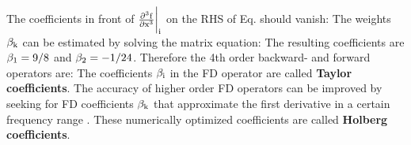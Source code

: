 \documentclass[11pt,onecolumn,oneside]{article}
\begin{document}
The coefficients in front of $\rm{\frac{\partial^3 f}{\partial x^3}\biggr|_i}$ on the RHS of Eq.  should vanish:
The weights $\rm{\beta_k}$ can be estimated by solving the matrix equation:
The resulting coefficients are $\rm{\beta_1=9/8}$ and $\rm{\beta_2=-1/24}$. Therefore the 4th order backward- and forward operators are:
The coefficients $\rm{\beta_i}$ in the FD operator are called {\bf{Taylor coefficients}}. 
The accuracy of higher order FD operators can be improved by seeking for FD coefficients $\rm{\beta_k}$ that approximate the first derivative in a certain frequency range \cite{holberg:87}. These numerically optimized coefficients are called {\bf{Holberg coefficients}}.
\end{document}

